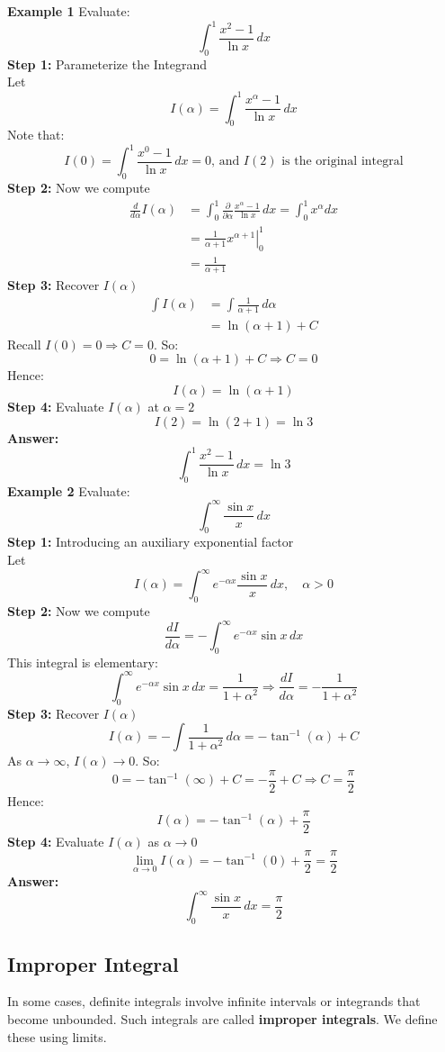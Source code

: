 \documentclass[11pt]{article}
\begin{document}
\textbf{Example 1}
Evaluate:
\[
    \int_0^1 \frac{x^2-1}{\ln x}\,dx
\]
\textbf{Step 1: }Parameterize the Integrand\\
Let
\[
    I(\alpha)=\int_0^1 \frac{x^\alpha-1}{\ln x}\,dx
\]Note that:
\[
    I(0)=\int_0^1 \frac{x^0-1}{\ln x}\,dx=0\text{, and }I(2)\text{ is the original integral}
\]
\textbf{Step 2: }Now we compute
\[
    \begin{split}
        \frac{d}{d\alpha}I(\alpha)&=\int_0^1 \frac{\partial}{\partial\alpha}\frac{x^\alpha-1}{\ln x}\,dx=\int_0^1 x^\alpha dx\\
        &=\left.\frac{1}{\alpha +1}x^{\alpha +1}\right|_0^1\\
        &=\frac{1}{\alpha + 1} 
    \end{split}
\]
\textbf{Step 3: }Recover $I(\alpha)$
\[
    \begin{split}
        \int I(\alpha)&=\int \frac{1}{\alpha + 1}\,d\alpha\\
        &=\ln(\alpha + 1)+C
    \end{split}
\]Recall $I(0)=0 \Rightarrow C=0$. So:
\[
    0=\ln(\alpha + 1)+C\Rightarrow C=0
\]
Hence:
\[
    I(\alpha)=\ln(\alpha + 1)
\]
\textbf{Step 4: }Evaluate $I(\alpha)$ at $\alpha = 2$
\[
    I(2)=\ln(2 + 1)=\ln3
\]
\textbf{Answer: }
\[
    \int_0^1 \frac{x^2-1}{\ln x}\,dx=\ln3
\]
\newline
\textbf{Example 2}
Evaluate:
\[
    \int_0^{\infty} \frac{\sin x}{x}\,dx
\]
\textbf{Step 1: }Introducing an auxiliary exponential factor\\
Let
\[
    I(\alpha) = \int_0^{\infty} e^{-\alpha x} \frac{\sin x}{x} \, dx, \quad \alpha > 0
\]
\textbf{Step 2: }Now we compute
\[
    \frac{dI}{d\alpha} = -\int_0^{\infty} e^{-\alpha x} \sin x \, dx
\]
This integral is elementary:
\[
    \int_0^{\infty} e^{-\alpha x} \sin x \, dx = \frac{1}{1 + \alpha^2}
    \Rightarrow \frac{dI}{d\alpha} = -\frac{1}{1 + \alpha^2}
\]
\textbf{Step 3: }Recover $I(\alpha)$
\[
    I(\alpha) = -\int \frac{1}{1 + \alpha^2} \, d\alpha = -\tan^{-1}(\alpha) + C
\]
As $\alpha \to \infty$, $I(\alpha) \to 0$. So:
\[
    0 = -\tan^{-1}(\infty) + C = -\frac{\pi}{2} + C \Rightarrow C = \frac{\pi}{2}
\]
Hence:
\[
    I(\alpha) = - \tan^{-1}(\alpha)+\frac{\pi}{2}
\]
\textbf{Step 4: }Evaluate $I(\alpha)$ as $\alpha \to 0$
\[
    \lim_{\alpha \to 0} I(\alpha) = -\tan^{-1}(0)+\frac{\pi}{2} = \frac{\pi}{2}
\]
\textbf{Answer: }
\[
    \int_0^{\infty} \frac{\sin x}{x}\,dx=\frac{\pi}{2}
\]


\newpage
\subsection{Improper Integral}
In some cases, definite integrals involve infinite intervals or integrands that become unbounded. Such integrals are called \textbf{improper integrals}. We define these using limits.
\end{document}
